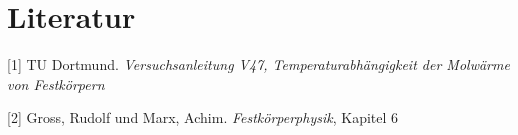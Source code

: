 \section{Literatur}
[1] \; TU Dortmund. \textit{Versuchsanleitung V47, Temperaturabhängigkeit der Molwärme von Festkörpern}

[2] \; Gross, Rudolf und Marx, Achim. \textit{Festkörperphysik}, Kapitel 6


